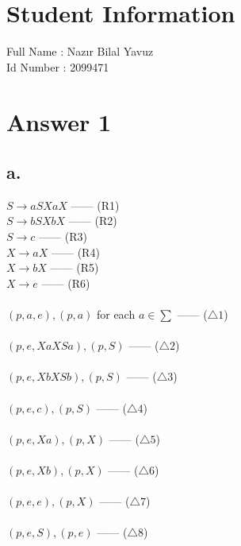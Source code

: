 \documentclass[12pt]{article}
\begin{document}
\section*{Student Information } 
Full Name :  Nazır Bilal Yavuz\\
Id Number :  2099471\\

\section*{Answer 1}

\subsection*{a.}

$S \rightarrow aSXaX$  ------ (R1) \\
$S \rightarrow bSXbX$  ------ (R2) \\
$S \rightarrow c$  ------ (R3) \\ 
$X \rightarrow aX$  ------ (R4) \\
$X \rightarrow bX$  ------ (R5) \\
$X \rightarrow e$  ------ (R6) \\
\\
$(p,a,e),(p,a)$ for each $a \in \sum$  ------ ($\bigtriangleup1$)\\\\
$(p,e,XaXSa),(p,S)$  ------ ($\bigtriangleup2$)\\\\
$(p,e,XbXSb),(p,S)$  ------ ($\bigtriangleup3$)\\\\
$(p,e,c),(p,S)$  ------ ($\bigtriangleup4$)\\\\
$(p,e,Xa),(p,X)$  ------ ($\bigtriangleup5$)\\\\
$(p,e,Xb),(p,X)$  ------ ($\bigtriangleup6$)\\\\
$(p,e,e),(p,X)$  ------ ($\bigtriangleup7$)\\\\
$(p,e,S),(p,e)$  ------ ($\bigtriangleup8$)\\\\
\end{document}
